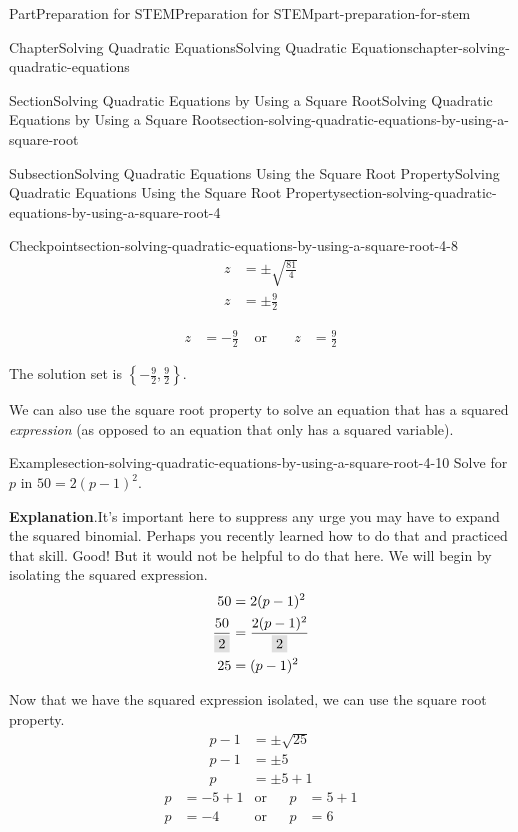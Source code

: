 \documentclass[twoside,10pt,]{book}
\newcommand{\blocktitlefont}{\relax}
\numberwithin{equation}{section}
\newcommand{\highlight}[1]{\mathchoice{\colorbox{lightsapphire}{$\displaystyle #1$}}{\colorbox{lightsapphire}{$\textstyle #1$}}{\colorbox{lightsapphire}{$\scriptstyle #1$}}{\colorbox{lightsapphire}{$\scriptscriptstyle #1$}}}
\newcommand{\divideunder}[2]{\frac{#1}{{\highlight{{#2}}}}}
\newcommand{\amp}{&}
\begin{document}
\begin{partptx}{Part}{Preparation for STEM}{}{Preparation for STEM}{}{}{part-preparation-for-stem}
\begin{chapterptx}{Chapter}{Solving Quadratic Equations}{}{Solving Quadratic Equations}{}{}{chapter-solving-quadratic-equations}
\begin{sectionptx}{Section}{Solving Quadratic Equations by Using a Square Root}{}{Solving Quadratic Equations by Using a Square Root}{}{}{section-solving-quadratic-equations-by-using-a-square-root}
\begin{subsectionptx}{Subsection}{Solving Quadratic Equations Using the Square Root Property}{}{Solving Quadratic Equations Using the Square Root Property}{}{}{section-solving-quadratic-equations-by-using-a-square-root-4}
\begin{inlineexercise}{Checkpoint}{}{section-solving-quadratic-equations-by-using-a-square-root-4-8}
\begin{equation*}
\begin{aligned}
z\amp=\pm\sqrt{\frac{81}{4}}\\
z\amp=\pm\frac{9}{2}
\end{aligned}
\end{equation*}
%
\par
%
\begin{equation*}
\begin{aligned}
z\amp=-\frac{9}{2}\amp\text{ or }\amp\amp z\amp=\frac{9}{2}
\end{aligned}
\end{equation*}
%
\par
The solution set is \(\left\{-\frac{9}{2},\frac{9}{2}\right\}\text{.}\)%
\end{inlineexercise}%
We can also use the square root property to solve an equation that has a squared \emph{expression} (as opposed to an equation that only has a squared variable).%
\begin{example}{Example}{}{section-solving-quadratic-equations-by-using-a-square-root-4-10}%
Solve for \(p\) in \(50=2(p-1)^2\).%
\par\smallskip%
{\makeatletter{}\makeatother\noindent\textbf{\blocktitlefont Explanation}.\hypertarget{section-solving-quadratic-equations-by-using-a-square-root-4-10-2}{}\quad{}It's important here to suppress any urge you may have to expand the squared binomial. Perhaps you recently learned how to do that and practiced that skill. Good! But it would not be helpful to do that here. We will begin by isolating the squared expression.%
\begin{align*}
50\amp=2(p-1)^2\\
\divideunder{50}{2}\amp=\divideunder{2(p-1)^2}{2}\\
25\amp=(p-1)^2
\end{align*}
%
}\par
Now that we have the squared expression isolated, we can use the square root property.%
\begin{align*}
p-1\amp=\pm\sqrt{25}\\
p-1\amp=\pm5\\
p\amp=\pm5+1
\end{align*}
%
\begin{align*}
p\amp=-5+1\amp\text{or}\amp\amp p\amp=5+1\\
p\amp=-4\amp\text{or}\amp\amp p\amp=6
\end{align*}

\end{example}
\end{subsectionptx}
\end{sectionptx}
\end{chapterptx}
\end{partptx}
\end{document}
